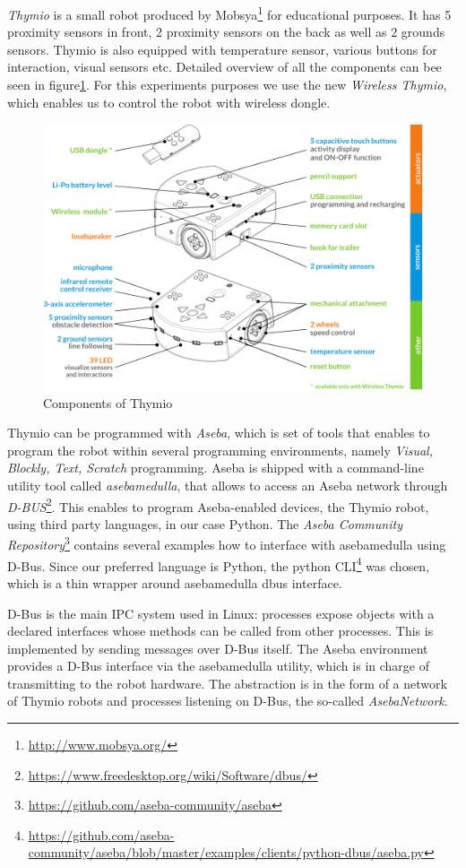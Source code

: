 \documentclass[format=acmsmall, review=false, screen=true]{acmart}
\begin{document}
\emph{Thymio}\cite{mondana2017thymio} is a small robot produced by Mobsya\footnote{\url{http://www.mobsya.org/}} for educational purposes. It has 5 proximity sensors in front, 2 proximity sensors on the back as well as 2 grounds sensors. Thymio is also equipped with temperature sensor, various buttons for interaction, visual sensors etc. Detailed overview of all the components can bee seen in figure\ref{fig:thymio}. For this experiments purposes we use the new \emph{Wireless Thymio}, which enables us to control the robot with wireless dongle.

\begin{figure}[H]
  \includegraphics[width=0.6\linewidth]{img/thymio.PNG}
  \caption{\label{fig:thymio}Components of Thymio}
\end{figure}

Thymio can be programmed with \emph{Aseba}\cite{retornaz2013seamless}, which is set of tools that enables to program the robot within several programming environments, namely \emph{Visual, Blockly, Text, Scratch} programming. Aseba is shipped with a command-line utility tool called \emph{asebamedulla}, that allows to access an Aseba network through \emph{D-BUS}\footnote{\url{https://www.freedesktop.org/wiki/Software/dbus/}}. This enables to program Aseba-enabled devices, the Thymio robot, using third party languages, in our case Python. The \emph{Aseba Community Repository}\footnote{\url{https://github.com/aseba-community/aseba}} contains several examples how to interface with asebamedulla using D-Bus. Since our preferred language is Python, the python CLI\footnote{\url{https://github.com/aseba-community/aseba/blob/master/examples/clients/python-dbus/aseba.py}} was chosen, which is a thin wrapper around asebamedulla dbus interface. 

D-Bus is the main IPC system used in Linux: processes expose objects with a declared interfaces whose methods can be called from other processes. This is implemented by sending messages over D-Bus itself. The Aseba environment provides a D-Bus interface via the asebamedulla utility, which is in charge of transmitting to the robot hardware. The abstraction is in the form of a network of Thymio robots and processes listening on D-Bus, the so-called \emph{AsebaNetwork}. 
\end{document}
